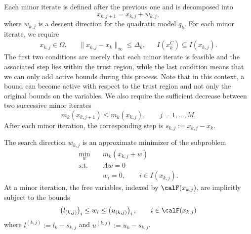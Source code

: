 Each minor iterate is defined after the previous one and is decomposed into 
\[x_{k,j+1}=x_{k,j}+w_{k,j},\]
where $w_{k,j}$ is a descent direction for the quadratic model $q_k$. For each minor iterate, we require
\begin{equation}\label{eq:minor_iterate_feasible}
	\begin{aligned}
		x_{k,j} \in \Omega, & & \|x_{k,j} - x_k \|_\infty \le \Delta_k, & & I(x_k^C) \subseteq I(x_{k,j}).
	\end{aligned}
\end{equation}
The first two conditions are merely that each minor iterate is feasible and the associated step lies within the trust region, while the last condition means that we can only add active bounds during this process. Note that in this context, a bound can become active with respect to the trust region and not only the original bounds on the variables.
We also require the sufficient decrease between two successive minor iterates
\begin{equation}\label{eq:minor_iterate_decrease}
	m_k(x_{k,j+1}) \le m_k(x_{k,j}), \qquad j = 1,\ldots,M.
\end{equation}
After each minor iteration, the corresponding step is $s_{k,j}:=x_{k,j}-x_k$.

The search direction $w_{k,j}$ is an approximate minimizer of the subproblem
\begin{subequations}\label{pb:minor_subpb}
	\begin{align}
		\min_w \quad & m_k(x_{k,j}+w) \\
		\text{s.t.} \quad & Aw=0 \label{subeq:minor_subpb_eq_cons} \\
		& w_i = 0, \qquad i \in I(x_{k,j}) \label{subeq:minor_subpb_fix_bounds}.
	\end{align}
\end{subequations}
At a minor iteration, the free variables, indexed by $\calF(x_{k,j})$, are implicitly subject to the bounds 
\begin{equation}\label{subeq:minor_subpb_bounds}
	\left(l_{(k,j)}\right)_i \le w_i \le \left(u_{(k,j)}\right)_i, \qquad i \in \calF(x_{k,j})
\end{equation}
where $l^{(k,j)}:= l_k - s_{k,j}$ and $u^{(k,j)}:= u_k - s_{k,j}$.

